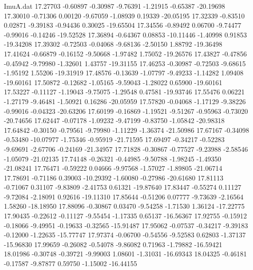 \begin{filecontents}{ImuA.dat}
  17.27703   -0.60897   -0.30987   -9.76391   -1.21915   -0.65387  -20.19698
  17.30010   -0.71306    0.00120   -9.67059   -1.08939    0.19339  -20.05195
  17.32339   -0.83510    0.02871   -9.39183   -0.94436    0.30025  -19.65504
  17.34556   -0.89492    0.06700   -9.74477   -0.99016   -0.14246  -19.52528
  17.36894   -0.64367    0.08853  -10.11446   -1.40998    0.91853  -19.34208
  17.39302   -0.72503   -0.04068   -9.68136   -2.50150    1.88792  -19.36498
  17.41624   -0.66879   -0.16152   -9.50668   -1.97482    1.75052  -19.26576
  17.43827   -0.47856   -0.45942   -9.79980   -1.32601    1.43757  -19.31155
  17.46253   -0.30987   -0.72503   -9.68615   -1.95192    1.55206  -19.31919
  17.48576   -0.13639   -1.07797   -9.49233   -1.14282    1.09408  -19.60161
  17.50872   -0.12682   -1.05165   -9.59043   -1.28022    0.65900  -19.60161
  17.53227   -0.11127   -1.19043   -9.75075   -1.29548    0.47581  -19.93746
  17.55476    0.06221   -1.27179   -9.46481   -1.50921    0.16286  -20.05959
  17.57820   -0.04068   -1.17129   -9.38226   -0.99016   -0.04323  -20.63206
  17.60199   -0.16869   -1.19521   -9.51267   -0.95963   -0.73020  -20.74656
  17.62447   -0.07178   -1.09232   -9.47199   -0.83750   -1.05842  -20.98318
  17.64842   -0.30150   -0.79561   -9.79980   -1.11229   -1.36374  -21.50986
  17.67167   -0.34098   -0.53480  -10.07977   -1.75346   -0.95919  -21.71595
  17.69497   -0.34217   -0.52283   -9.69691   -2.67706   -0.24169  -21.34957
  17.71828   -0.30867   -0.77527   -9.23988   -2.58546   -1.05079  -21.02135
  17.74148   -0.26321   -0.44985   -9.50788   -1.98245   -1.49350  -21.08241
  17.76471   -0.59222    0.04666   -9.97568   -1.57027   -1.89805  -21.06714
  17.78691   -0.71186    0.39003  -10.29392   -1.60080   -0.27986  -20.61680
  17.81113   -0.71067    0.31107   -9.83809   -2.41753    0.61321  -19.87640
  17.83447   -0.55274    0.11127   -9.72084   -2.18091    0.92616  -19.11310
  17.85644   -0.51206    0.07777   -9.73639   -2.16564    1.58260  -18.18950
  17.88096   -0.30867    0.03470   -9.54258   -1.71530    1.36124  -17.22775
  17.90435   -0.22612   -0.11127   -9.55454   -1.17335    0.65137  -16.56367
  17.92755   -0.15912   -0.18066   -9.49951   -0.19633   -0.32565  -15.91487
  17.95062   -0.07537   -0.34217   -9.39183   -0.12000   -1.22635  -15.77747
  17.97374   -0.06700   -0.54556   -9.52583    0.62803   -1.37137  -15.96830
  17.99659   -0.26082   -0.54078   -9.86082    0.71963   -1.79882  -16.59421
  18.01986   -0.30748   -0.39721   -9.99003    1.08601   -1.31031  -16.69343
  18.04325   -0.46181   -0.17587   -9.87877    0.59750   -1.15002  -16.44155

\end{filecontents}
